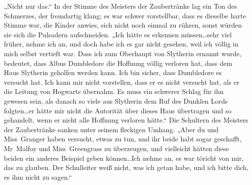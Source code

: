 „Nicht nur das.“
In der Stimme des Meisters der Zaubertränke lag ein Ton des Schmerzes, der fremdartig klang; es war schwer vorstellbar, dass es dieselbe harte Stimme war, die Kinder anwies, sich nicht noch einmal zu rühren, sonst würden sie sich die Pulsadern aufschneiden.
„Ich hätte es erkennen müssen…sehr viel früher, nehme ich an, und doch habe ich es gar nicht gesehen, weil ich völlig in mich selbst vertieft war. Dass ich zum Oberhaupt von Slytherin ernannt wurde, bedeutet, dass Albus Dumbledore die Hoffnung völlig verloren hat, dass dem Haus Slytherin geholfen werden kann. Ich bin sicher, dass Dumbledore es versucht hat. Ich kann mir nicht vorstellen, dass er es nicht versucht hat, als er die Leitung von Hogwarts übernahm. Es muss ein schwerer Schlag für ihn gewesen sein, als danach so viele aus Slytherin dem Ruf des Dunklen Lords folgten…er hätte mir nicht die Autorität über dieses Haus übertragen und so gehandelt, wenn er nicht alle Hoffnung verloren hätte.“
Die Schultern des Meisters der Zaubertränke sanken unter seinem fleckigen Umhang. „Aber du und Miss~Granger haben versucht, etwas zu tun, und ihr beide habt sogar geschafft, Mr~Malfoy und Miss~Greengrass zu überzeugen, und vielleicht hätten diese beiden ein anderes Beispiel geben können…Ich nehme an, es war töricht von mir, das zu glauben. Der Schulleiter weiß nicht, was ich getan habe, und ich bitte dich, es ihm nicht zu sagen.“


